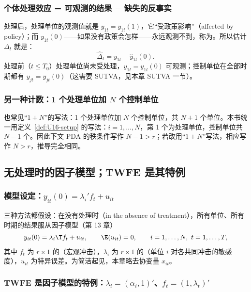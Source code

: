 \subsubsection{个体处理效应 = 可观测的结果 $-$ 缺失的反事实}

处理后，处理单位的观测值就是 $y_{1t}=y_{1t}(1)$，它“受政策影响”（affected by policy）；而 $y_{1t}(0)$——如果没有政策会怎样——永远观测不到，称为。所以估计 $\Delta_t$ 就是：
\[
\hat\Delta_t=y_{1t}-\hat y_{1t}(0).
\]
处理前（$t\le T_0$）处理单位尚未受处理，$y_{1t}=y_{1t}(0)$ 可观测；控制单位在全部时期都有 $y_{jt}=y_{jt}(0)$（这需要 SUTVA，见本章 SUTVA 一节）。

\subsubsection{另一种计数：1 个处理单位加 \texorpdfstring{$N$}{N} 个控制单位}

\begin{note}[两种计数方式]
也常见“$1+N$”的写法：1 个处理单位加 $N$ 个控制单位，共 $N+1$ 个单位。本书统一用定义~\ref{def:U16-setup} 的写法：$i=1,\dots,N$，第 1 个为处理单位，控制单位共 $N-1$ 个。因此下文 PDA 的秩条件写作 $N-1>r$；若改用“$1+N$”写法，相应写作 $N>r$，推导完全相同。
\end{note}

\subsection{无处理时的因子模型；TWFE 是其特例}

\subsubsection{模型设定：\texorpdfstring{$y_{it}(0)=\lambda_i'f_t+u_{it}$}{y\_it(0) = lambda\_i' f\_t + u\_it}}

三种方法都假设：在没有处理时（in the absence of treatment），所有单位、所有时期的结果服从因子模型（第 13 章）
\begin{equation}\label{eq:U16-factor}
y_{it}(0)=\lambda_i\T f_t+u_{it},\qquad \E(u_{it})=0,\qquad i=1,\dots,N,\ t=1,\dots,T,
\end{equation}
其中 $f_t$ 为 $r\times 1$ 的（宏观冲击），$\lambda_i$ 为 $r\times1$ 的（单位 $i$ 对各共同冲击的敏感度），$u_{it}$ 为特异误差。为简洁起见，本章略去协变量 $x_{it}$。

\subsubsection{TWFE 是因子模型的特例：\texorpdfstring{$\lambda_i=(\alpha_i,1)'$}{lambda\_i=(alpha\_i,1)'}、\texorpdfstring{$f_t=(1,\lambda_t)'$}{f\_t=(1,lambda\_t)'}}

